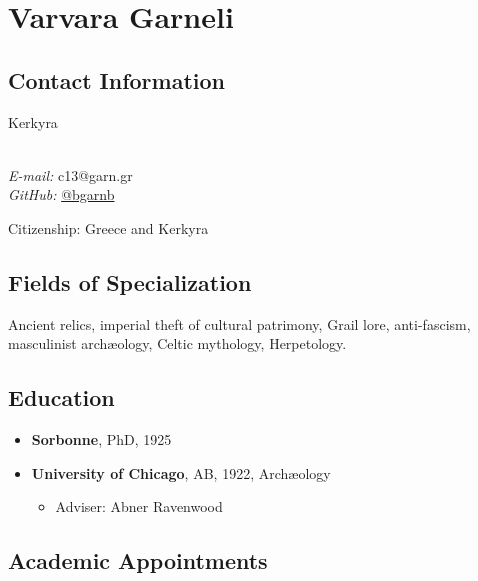 \documentclass[%
    11pt,
  oneside
  ]{memoir}
\let\oldsection\section
\renewcommand{\section}[1]{%
  \oldsection{#1}
  \leavevmode
  \par
  \vspace{\dimexpr-\baselineskip-\parskip}
}
\begin{document}
      \chapter*{Varvara Garneli}
  

  \hypertarget{contact-information}{%
  \section{Contact Information}\label{contact-information}}
    \begin{minipage}[t]{0.3\textwidth}
      Kerkyra\\ \\ 
    \end{minipage}
    \begin{minipage}[t]{0.7\textwidth}
                        {\textit{E-mail:}} c13@garn.gr \\
                                        {\textit{GitHub:}} \href{http://github.com/bgarnb}{@bgarnb}
            \end{minipage}
    \medskip%
    \par Citizenship:
    Greece and Kerkyra
  \hypertarget{fields-of-specialization}{%
\section{Fields of Specialization}\label{fields-of-specialization}}

Ancient relics, imperial theft of cultural patrimony, Grail lore,
anti-fascism, masculinist archæology, Celtic mythology, Herpetology.

\hypertarget{education}{%
\section{Education}\label{education}}

\begin{itemize}
\tightlist
\item
  \textbf{Sorbonne}, PhD, 1925
\item
  \textbf{University of Chicago}, AB, 1922, Archæology

  \begin{itemize}
  \tightlist
  \item
    Adviser: Abner Ravenwood
  \end{itemize}
\end{itemize}

\hypertarget{academic-appointments}{%
\section{Academic Appointments}\label{academic-appointments}}
\end{document}

